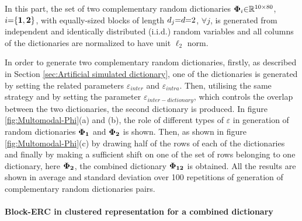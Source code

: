 In this part, the set of two complementary random dictionaries $\boldsymbol{\Phi}_i {\in} \mathbb{R}^{10 {\times} 80}$, $i {=} \{\boldsymbol{1} , \boldsymbol{2} \}$, with equally-sized blocks of length $d_j {=} d {=} 2$, $\forall j$, is generated from independent and identically distributed (i.i.d.) random variables and all columns of the dictionaries are normalized to have unit $\ell_2$ norm.

In order to generate two complementary random dictionaries, 
firstly, as described in Section \ref{sec:Artificial simulated dictionary}, one of the dictionaries is generated by setting the related parameters $\varepsilon_{inter}$ and $\varepsilon_{intra}$.
Then, utilising the same strategy and by setting the parameter $\varepsilon_{inter-dictionary}$, which controls the overlap between the two dictionaries, the second dictionary is produced.
In figure \ref{fig:Multomodal-Phi}(a) and (b), the role of different types of $\varepsilon$ in generation of random dictionaries $\boldsymbol{\Phi}_{\boldsymbol{1}}$ and $\boldsymbol{\Phi}_{\boldsymbol{2}}$ is shown.
Then, as shown in figure \ref{fig:Multomodal-Phi}(c) by drawing half of the rows of each of the dictionaries and finally by making a sufficient shift on one of the set of rows belonging to one dictionary, here $\boldsymbol{\Phi}_{\boldsymbol{2}}$, the combined dictionary $\boldsymbol{\Phi}_{\boldsymbol{12}}$ is obtained.
All the results are shown in average and standard deviation over 100 repetitions of generation of complementary random dictionaries pairs.

\FloatBarrier
\paragraph{Block-ERC in clustered representation for a combined dictionary}
